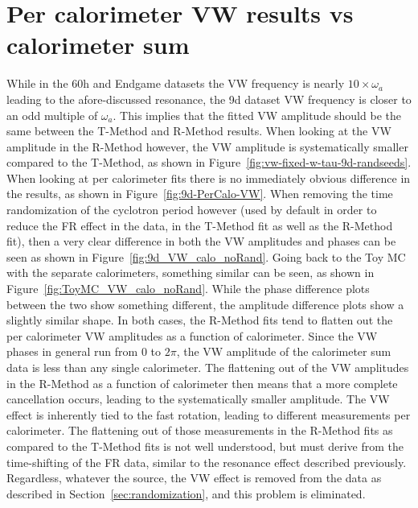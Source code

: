 \documentclass[12pt,letterpaper]{article}
\newcommand{\figref}[1]{Figure~\ref{#1}}
\def\wa{$\omega_{a}$\xspace}
\begin{document}
\clearpage


\section{Per calorimeter VW results vs calorimeter sum}


While in the 60h and Endgame datasets the VW frequency is nearly $10 \times \omega_{a}$ leading to the afore-discussed resonance, the 9d dataset VW frequency is closer to an odd multiple of \wa. This implies that the fitted VW amplitude should be the same between the T-Method and R-Method results. When looking at the VW amplitude in the R-Method however, the VW amplitude is systematically smaller compared to the T-Method, as shown in \figref{fig:vw-fixed-w-tau-9d-randseeds}. When looking at per calorimeter fits there is no immediately obvious difference in the results, as shown in \figref{fig:9d-PerCalo-VW}. When removing the time randomization of the cyclotron period however (used by default in order to reduce the FR effect in the data, in the T-Method fit as well as the R-Method fit), then a very clear difference in both the VW amplitudes and phases can be seen as shown in \figref{fig:9d_VW_calo_noRand}. Going back to the Toy MC with the separate calorimeters, something similar can be seen, as shown in \figref{fig:ToyMC_VW_calo_noRand}. While the phase difference plots between the two show something different, the amplitude difference plots show a slightly similar shape. In both cases, the R-Method fits tend to flatten out the per calorimeter VW amplitudes as a function of calorimeter. Since the VW phases in general run from 0 to $2\pi$, the VW amplitude of the calorimeter sum data is less than any single calorimeter. The flattening out of the VW amplitudes in the R-Method as a function of calorimeter then means that a more complete cancellation occurs, leading to the systematically smaller amplitude. The VW effect is inherently tied to the fast rotation, leading to different measurements per calorimeter. The flattening out of those measurements in the R-Method fits as compared to the T-Method fits is not well understood, but must derive from the time-shifting of the FR data, similar to the resonance effect described previously. Regardless, whatever the source, the VW effect is removed from the data as described in Section~\ref{sec:randomization}, and this problem is eliminated.
\end{document}
